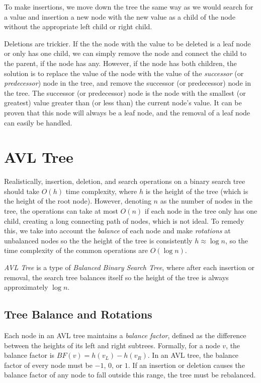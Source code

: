 \documentclass{article}
\begin{document}
To make insertions, we move down the tree the same way as we would search for a value and insertion a new node with the new value as a child of the node without the appropriate left child or right child.

Deletions are trickier. If the the node with the value to be deleted is a leaf node or only has one child, we can simply remove the node and connect the child to the parent, if the node has any. However, if the node has both children, the solution is to replace the value of the node with the value of the \emph{successor} (or \emph{predecessor}) node in the tree, and remove the successor (or predecessor) node in the tree. The successor (or predecessor) node is the node with the smallest (or greatest) value greater than (or less than) the current node's value. It can be proven that this node will always be a leaf node, and the removal of a leaf node can easily be handled.

\section{AVL Tree}
\label{avl_tree}

Realistically, insertion, deletion, and search operations on a binary search tree should take $O(h)$ time complexity, where $h$ is the height of the tree (which is the height of the root node). However, denoting $n$ as the number of nodes in the tree, the operations can take at most $O(n)$ if each node in the tree only has one child, creating a long connecting path of nodes, which is not ideal. To remedy this, we take into account the \emph{balance} of each node and make \emph{rotations} at unbalanced nodes so the the height of the tree is consistently $h \approx \log n$, so the time complexity of the common operations are $O(\log n)$.

\emph{AVL Tree} is a type of \emph{Balanced Binary Search Tree}, where after each insertion or removal, the search tree balances itself so the height of the tree is always approximately $\log n$.

\subsection*{Tree Balance and Rotations}
\label{balance_and_rotations}

Each node in an AVL tree maintains a \emph{balance factor}, defined as the difference between the heights of its left and right subtrees. Formally, for a node $v$, the balance factor is $BF(v) = h(v_L) - h(v_R)$. In an AVL tree, the balance factor of every node must be $-1$, $0$, or $1$. If an insertion or deletion causes the balance factor of any node to fall outside this range, the tree must be rebalanced.
\end{document}

